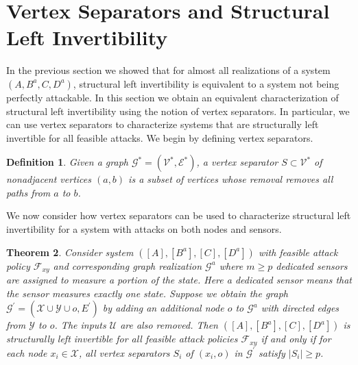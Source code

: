 \documentclass[letterpaper, 10 pt, conference]{ieeeconf}
\newtheorem{theorem}{Theorem}
\newtheorem{definition}[theorem]{Definition}
\begin{document}
\section{Vertex Separators and Structural Left Invertibility}
In the previous section we showed that for almost all realizations of a system $(A,B^a,C,D^a)$, structural left invertibility is equivalent to a system not being perfectly attackable. In this section we obtain an equivalent characterization of structural left invertibility using the notion of vertex separators. In particular, we can use vertex separators to characterize systems that are structurally left invertible for all feasible attacks.
We begin by defining vertex separators.
\begin{definition}
 Given a  graph $\mathcal{G^*} = (\mathcal{V^*},\mathcal{E^*})$, a vertex separator $S \subset \mathcal{V}^*$ of nonadjacent vertices $(a,b)$ is a subset of vertices whose removal  removes all paths from $a$ to $b$.
 \end{definition}
 We now consider how vertex separators can be used to characterize structural left invertibility for a system with attacks on both nodes and sensors.
\begin{theorem}
Consider system $([A],[B^a],[C],[D^a])$ with feasible attack policy $\mathcal{F}_{xy}$ and corresponding graph realization $\mathcal{G}^a$ where $m \ge p$ dedicated sensors are assigned to measure a portion of the state. Here a dedicated sensor means that the sensor measures exactly one state. Suppose we obtain the graph $\mathcal{G}^\prime = (\mathcal{X} \cup \mathcal{Y} \cup o, E^\prime)$ by adding an additional node $o$ to $\mathcal{G}^a$ with directed edges from $\mathcal{Y}$ to $o$. The inputs $\mathcal{U}$ are also removed. Then $([A],[B^a],[C],[D^a])$ is structurally left invertible for all feasible attack policies $\mathcal{F}_{xy}$ if and only if for each node $x_i \in \mathcal{X}$, all vertex separators $S_i$ of $(x_i,o)$ in $\mathcal{G}^\prime$ satisfy $|S_i| \ge p$.  \label{MengerCor}
\end{theorem}
\end{document}
